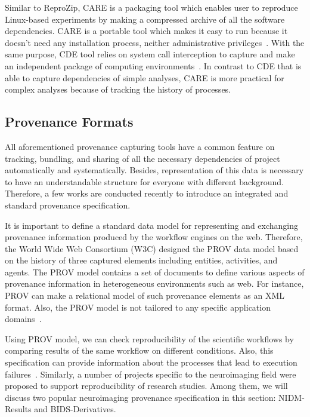 Similar to ReproZip, CARE is a packaging tool 
which enables user to reproduce Linux-based experiments by making a 
compressed archive of all the software dependencies. CARE is a portable 
tool which makes it easy to run because it doesn't need any 
installation process, neither administrative 
privileges~\cite{janin2014care}. With the same purpose, CDE tool 
relies on system call interception to capture and make an independent 
package of computing environments~\cite{guo2012cde}. In contrast to CDE 
that is able to capture dependencies of simple analyses, CARE is more 
practical for complex analyses because of tracking the history of 
processes. 


\subsection{Provenance Formats}

All aforementioned provenance capturing tools have a common feature on 
tracking, bundling, and sharing of all the necessary dependencies of 
project automatically and systematically. Besides, representation of 
this data is necessary to have an understandable structure for everyone 
with different background. Therefore, a few works are conducted 
recently to introduce an integrated and standard provenance 
specification. 

It is important to define a standard data model for representing and 
exchanging provenance information produced by the workflow engines on 
the web. Therefore, the World Wide Web Consortium (W3C) designed the 
PROV data model based on the history of three captured elements 
including entities, activities, and agents. The PROV model contains a 
set of documents to define various aspects of provenance information in 
heterogeneous environments such as web. For instance, PROV can make a 
relational model of such provenance elements as an XML format. Also, 
the PROV model is not tailored to any specific application 
domains~\cite{cheney2012principles, missier2013w3c}.

Using PROV model, we can check reproducibility of the scientific 
workflows by comparing results of the same workflow on different 
conditions. Also, this specification can provide information about the 
processes that lead to execution failures~\cite{missier2013w3c}. 
Similarly, a number of projects specific to the neuroimaging field were 
proposed to support reproducibility of research studies. Among 
them, we will discuss two popular neuroimaging provenance specification 
in this section: NIDM-Results and BIDS-Derivatives. 

